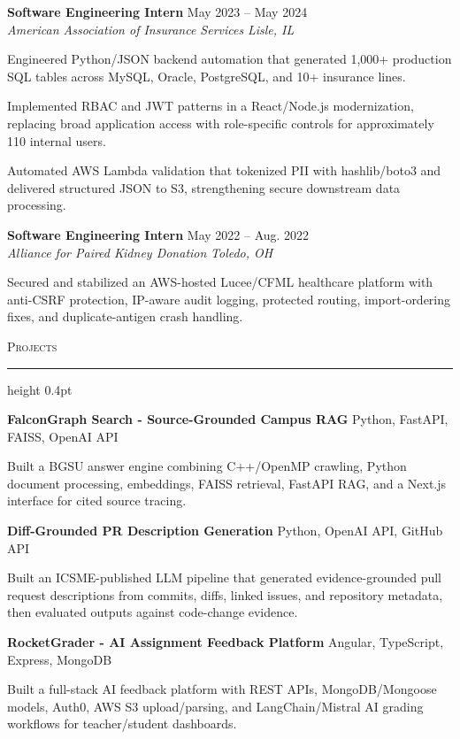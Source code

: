 \documentclass[letterpaper,11pt]{article}
\newcommand{\resumesection}[1]{%
  \par\vspace{2pt}%
  {\large\scshape #1}\par\vspace{2pt}%
  \hrule height 0.4pt\vspace{2pt}%
}
\newcommand{\resumeSubheading}[4]{
  \textbf{#1} \hfill #2\\
  \textit{#3} \hfill \textit{#4}
}
\newcommand{\projectHeading}[2]{
  \textbf{#1} \hfill #2
}
\begin{document}
\resumeSubheading
{Software Engineering Intern}{May 2023 -- May 2024}
{American Association of Insurance Services}{Lisle, IL}
\begin{tightitemize}
  \item Engineered Python/JSON backend automation that generated 1,000+ production SQL tables across MySQL, Oracle, PostgreSQL, and 10+ insurance lines.
  \item Implemented RBAC and JWT patterns in a React/Node.js modernization, replacing broad application access with role-specific controls for approximately 110 internal users.
  \item Automated AWS Lambda validation that tokenized PII with hashlib/boto3 and delivered structured JSON to S3, strengthening secure downstream data processing.
\end{tightitemize}

\resumeSubheading
{Software Engineering Intern}{May 2022 -- Aug. 2022}
{Alliance for Paired Kidney Donation}{Toledo, OH}
\begin{tightitemize}
  \item Secured and stabilized an AWS-hosted Lucee/CFML healthcare platform with anti-CSRF protection, IP-aware audit logging, protected routing, import-ordering fixes, and duplicate-antigen crash handling.
\end{tightitemize}

\resumesection{Projects}
\projectHeading{FalconGraph Search - Source-Grounded Campus RAG}{Python, FastAPI, FAISS, OpenAI API}
\begin{tightitemize}
  \item Built a BGSU answer engine combining C++/OpenMP crawling, Python document processing, embeddings, FAISS retrieval, FastAPI RAG, and a Next.js interface for cited source tracing.
\end{tightitemize}

\projectHeading{Diff-Grounded PR Description Generation}{Python, OpenAI API, GitHub API}
\begin{tightitemize}
  \item Built an ICSME-published LLM pipeline that generated evidence-grounded pull request descriptions from commits, diffs, linked issues, and repository metadata, then evaluated outputs against code-change evidence.
\end{tightitemize}

\projectHeading{RocketGrader - AI Assignment Feedback Platform}{Angular, TypeScript, Express, MongoDB}
\begin{tightitemize}
  \item Built a full-stack AI feedback platform with REST APIs, MongoDB/Mongoose models, Auth0, AWS S3 upload/parsing, and LangChain/Mistral AI grading workflows for teacher/student dashboards.
\end{tightitemize}
\end{document}
